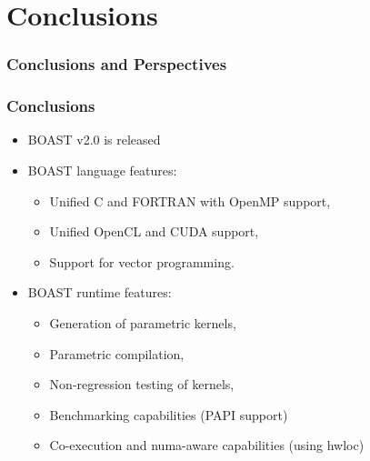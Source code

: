 \documentclass{beamer}
\begin{document}

\section{Conclusions}

\begin{frame}
\frametitle{Conclusions and Perspectives}
\end{frame}

\begin{frame}
  \frametitle{Conclusions}
  \begin{itemize}
    \item BOAST v2.0 is released
    \item BOAST language features:
    \begin{itemize}
      \item Unified C and FORTRAN with OpenMP support,
      \item Unified OpenCL and CUDA support,
      \item Support for vector programming.
    \end{itemize}
    \item BOAST runtime features:
    \begin{itemize}
      \item Generation of parametric kernels,
      \item Parametric compilation,
      \item Non-regression testing of kernels,
      \item Benchmarking capabilities (PAPI support)
      \item Co-execution and numa-aware capabilities (using hwloc)
    \end{itemize}
  \end{itemize}
\end{frame}
\end{document}

